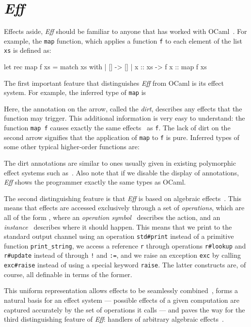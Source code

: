 \documentclass{LMCS}
\newcommand{\Eff}{\emph{Eff}\xspace}
\let\inline\lstinline
\begin{document}
\section{\Eff}
\label{sec:eff}

Effects aside, \Eff should be familiar to anyone that has worked with OCaml~\cite{ocaml}.
For example, the \inline{map} function,
which applies a function \inline{f} to each element of the list \inline{xs}
is defined as:
\begin{source}
  let rec map f xs =
    match xs with
    | [] -> []
    | x :: xs -> f x :: map f xs
\end{source}
The first important feature that distinguishes \Eff from OCaml is its effect system.
For example, the inferred type of \inline{map} is 

Here, the annotation on the arrow, called the \emph{dirt},
describes any effects that the function may trigger.
This additional information is very easy to understand:
the function \inline{map f} causes exactly the same effects~ as \inline{f}.
The lack of dirt on the second arrow signifies that the application of \inline{map} to \inline{f} is pure.
Inferred types of some other typical higher-order functions are:

The dirt annotations are similar to ones usually given in existing polymorphic effect systems such as~\cite{leroy2000type}.
Also note that if we disable the display of annotations, \Eff shows the programmer exactly the same types as OCaml.

The second distinguishing feature is that \Eff is based on algebraic effects~\cite{plotkin2001adequacy, plotkin2003algebraic}.
This means that effects are accessed exclusively through a set of \emph{operations},
which are all of the form ,
  where an \emph{operation symbol}~ describes the action,
  and an \emph{instance}~ describes where it should happen.
This means that we print to the standard output channel
using an operation \inline{std#print} instead of a primitive function \inline{print_string},
we access a reference \inline{r}
through operations \inline{r#lookup} and \inline{r#update} instead of through \inline{!} and \inline{:=},
and we raise an exception \inline{exc}
by calling \inline{exc#raise} instead of using a special keyword \inline{raise}.
The latter constructs are, of course, all definable in terms of the former.

This uniform representation allows effects to be seamlessly combined~\cite{hyland2006combining},
forms a natural basis for an effect system ---
possible effects of a given computation are captured accurately by the set of operations it calls ---
and paves the way for the third distinguishing feature of \Eff: handlers of arbitrary algebraic effects~\cite{plotkin2009handlers}.
\end{document}
